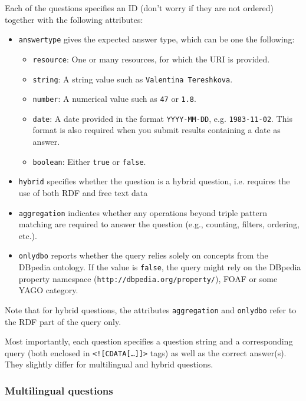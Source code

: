 Each of the questions specifies an ID (don't worry if they are not ordered) together with the following attributes:
\begin{itemize}
\item {\tt answertype} gives the expected answer type, which can be one the following:
\begin{itemize}
\item {\tt resource}: One or many resources, for which the URI is provided.
\item {\tt string}: A string value such as {\tt Valentina Tereshkova}.
\item {\tt number}: A numerical value such as {\tt 47} or {\tt 1.8}.
\item {\tt date}: A date provided in the format {\tt YYYY-MM-DD}, e.g. {\tt 1983-11-02}. 
This format is also required when you submit results containing a date as answer.
\item {\tt boolean}: Either {\tt true} or {\tt false}.
\end{itemize}
\item {\tt hybrid} specifies whether the question is a hybrid question, i.e. requires the use of both RDF and free text data 
\item {\tt aggregation} indicates whether any operations beyond triple pattern matching are required to answer the question (e.g., counting, filters, ordering, etc.).
\item {\tt onlydbo} reports whether the query relies solely on concepts from the DBpedia ontology. If the value is {\tt false}, the query might rely on 
the DBpedia property namespace (\texttt{http://dbpedia.org/property/}), FOAF or some YAGO category. 
\end{itemize}
Note that for hybrid questions, the attributes {\tt aggregation} and {\tt onlydbo} refer to the RDF part of the query only. 

Most importantly, each question specifies a question string and a corresponding query (both enclosed in {\tt <![CDATA[\ldots]]>} tags) 
as well as the correct answer(s). 
They slightly differ for multilingual and hybrid questions.


\subsubsection{Multilingual questions}

